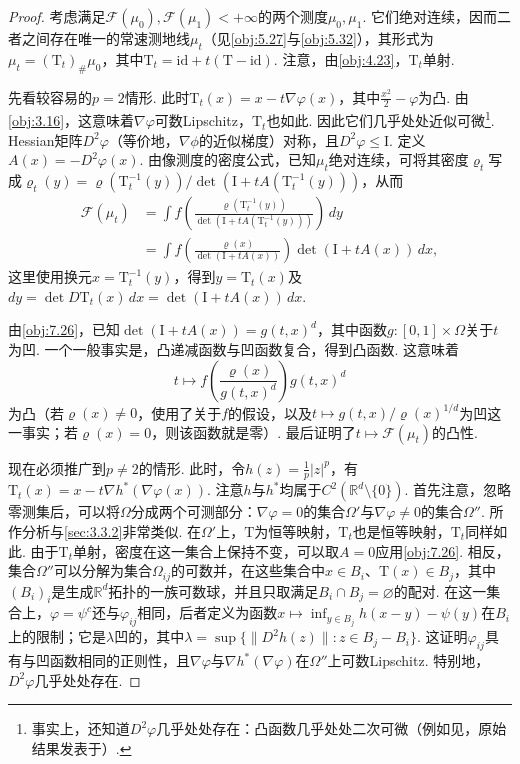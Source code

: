 \begin{proof}
考虑满足$\mathscr F(\mu_0),\mathscr F(\mu_1)<+\infty$的两个测度$\mu_0,\mu_1$. 它们绝对连续，因而二者之间存在唯一的常速测地线$\mu_t$（见\autoref{obj:5.27}与\autoref{obj:5.32}），其形式为$\mu_t=(\mathrm T_t)_\#\mu_0$，其中$\mathrm T_t=\mathrm{id}+t(\mathrm T-\mathrm{id})$. 注意，由\autoref{obj:4.23}，$\mathrm T_t$单射.

\label{idx:i30-p272}
先看较容易的$p=2$情形. 此时$\mathrm T_t(x)=x-t\nabla\varphi(x)$，其中$\frac{x^2}2-\varphi$为凸. 由\autoref{obj:3.16}，这意味着$\nabla\varphi$可数Lipschitz，$\mathrm T_t$也如此. 因此它们几乎处处近似可微\footnote{事实上，还知道$D^2\varphi$几乎处处存在：凸函数几乎处处二次可微（例如见\cite{b160}，原始结果发表于\cite{b6}）.}. Hessian矩阵$D^2\varphi$（等价地，$\nabla\phi$的近似梯度）对称，且$D^2\varphi\leq\mathrm I$. 定义$A(x)=-D^2\varphi(x)$. \label{idx:i39-p273}
由像测度的密度公式，已知$\mu_t$绝对连续，可将其密度$\varrho_t$写成$\varrho_t(y)=\varrho(\mathrm T_t^{-1}(y))/\det(\mathrm I+tA(\mathrm T_t^{-1}(y)))$，从而
\[
\begin{aligned}
 \mathscr F(\mu_t)&=\int f\left(\frac{\varrho(\mathrm T_t^{-1}(y))}
             {\det(\mathrm I+tA(\mathrm T_t^{-1}(y)))}\right)\,dy\\
 &=\int f\left(\frac{\varrho(x)}{\det(\mathrm I+tA(x))}\right)
                  \det(\mathrm I+tA(x))\,dx,
\end{aligned}
\]
这里使用换元$x=\mathrm T_t^{-1}(y)$，得到$y=\mathrm T_t(x)$及$dy=\det D\mathrm T_t(x)\,dx=\det(\mathrm I+tA(x))\,dx$.

由\autoref{obj:7.26}，已知$\det(\mathrm I+tA(x))=g(t,x)^d$，其中函数$g:[0,1]\times\Omega$关于$t$为凹. 一个一般事实是，凸递减函数与凹函数复合，得到凸函数. 这意味着
\[
 t\mapsto f\left(\frac{\varrho(x)}{g(t,x)^d}\right)g(t,x)^d
\]
为凸（若$\varrho(x)\ne0$，使用了关于$f$的假设，以及$t\mapsto g(t,x)/\varrho(x)^{1/d}$为凹这一事实；若$\varrho(x)=0$，则该函数就是零）. 最后证明了$t\mapsto\mathscr F(\mu_t)$的凸性.

现在必须推广到$p\ne2$的情形. 此时，令$h(z)=\frac1p|z|^p$，有$\mathrm T_t(x)=x-t\nabla h^*(\nabla\varphi(x))$. 注意$h$与$h^*$均属于$C^2(\mathbb R^d\setminus\{0\})$. 首先注意，忽略零测集后，可以将$\Omega$分成两个可测部分：$\nabla\varphi=0$的集合$\Omega'$与$\nabla\varphi\ne0$的集合$\Omega''$. 所作分析与\autoref{sec:3.3.2}非常类似. 在$\Omega'$上，$\mathrm T$为恒等映射，$\mathrm T_t$也是恒等映射，$\mathrm T_t$同样如此. 由于$\mathrm T_t$单射，密度在这一集合上保持不变，可以取$A=0$应用\autoref{obj:7.26}. 相反，集合$\Omega''$可以分解为集合$\Omega_{ij}$的可数并，在这些集合中$x\in B_i$、$\mathrm T(x)\in B_j$，其中$(B_i)_i$是生成$\mathbb R^d$拓扑的一族可数球，并且只取满足$B_i\cap B_j=\varnothing$的配对. 在这一集合上，$\varphi=\psi^c$还与$\varphi_{ij}$相同，后者定义为函数$x\mapsto\inf_{y\in B_j}h(x-y)-\psi(y)$在$B_i$上的限制；它是$\lambda$凹的，其中$\lambda=\sup\{\|D^2h(z)\|:z\in B_j-B_i\}$. 这证明$\varphi_{ij}$具有与凹函数相同的正则性，且$\nabla\varphi$与$\nabla h^*(\nabla\varphi)$在$\Omega''$上可数Lipschitz. 特别地，$D^2\varphi$几乎处处存在.


\end{proof}
